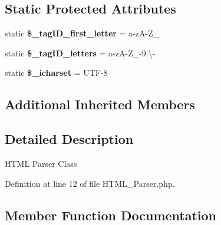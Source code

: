 \subsection*{Static Protected Attributes}
\begin{DoxyCompactItemize}
\item 
\mbox{\label{classduzun_1_1hQuery_1_1HTML__Parser_a12d98ca660edc18fe28145aaa2409e75}} 
static {\bfseries \$\+\_\+tag\+I\+D\+\_\+first\+\_\+letter} = \textquotesingle{}a-\/zA-\/Z\+\_\+\textquotesingle{}
\item 
\mbox{\label{classduzun_1_1hQuery_1_1HTML__Parser_ae23502b1388a96f576627de9b708700e}} 
static {\bfseries \$\+\_\+tag\+I\+D\+\_\+letters} = \textquotesingle{}a-\/zA-\/Z\+\_-\/9\+:\textbackslash{}-\/\textquotesingle{}
\item 
\mbox{\label{classduzun_1_1hQuery_1_1HTML__Parser_a0251a92e5f4478f7b487e79b28936543}} 
static {\bfseries \$\+\_\+icharset} = \textquotesingle{}U\+TF-\/8\textquotesingle{}
\end{DoxyCompactItemize}
\subsection*{Additional Inherited Members}


\subsection{Detailed Description}
H\+T\+ML Parser Class 

Definition at line 12 of file H\+T\+M\+L\+\_\+\+Parser.\+php.



\subsection{Member Function Documentation}
\mbox{\label{classduzun_1_1hQuery_1_1HTML__Parser_acbbb861c06ae362dac6e67e05d296385}} 
